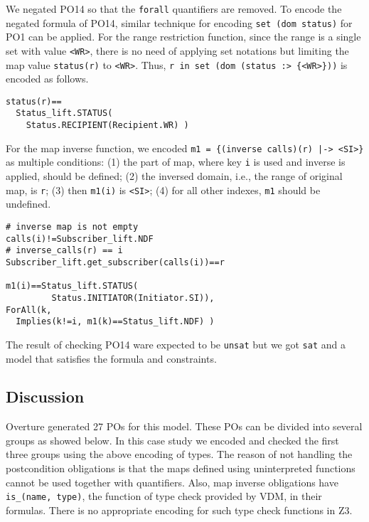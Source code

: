 We negated PO14 so that the {\tt forall} quantifiers are removed. To encode the negated formula of PO14, similar technique for  encoding {\tt set (dom status)} for PO1 can be applied. For the range restriction function, since the range is a single set with value {\tt <WR>}, there is no need of applying set notations but limiting the map value {\tt status(r)} to {\tt <WR>}. Thus, {\tt r in set (dom (status :> \{<WR>\}))} is encoded as follows.

\begin{mdframed}[roundcorner=5pt,shadow=true]
\begin{Verbatim}[fontsize=\small]
status(r)==
  Status_lift.STATUS(
    Status.RECIPIENT(Recipient.WR) )
\end{Verbatim}
\end{mdframed}

For the map inverse function, we encoded {\tt m1 = \{(inverse calls)(r) |-> <SI>\}} as multiple conditions: (1) the part of map, where key {\tt i} is used and inverse is applied, should be defined; (2) the inversed domain, i.e., the range of original map, is {\tt r}; (3) then {\tt m1(i)} is {\tt <SI>}; (4) for all other indexes, {\tt m1} should be undefined.

\begin{mdframed}[roundcorner=5pt,shadow=true]
\begin{Verbatim}[fontsize=\small]
# inverse map is not empty
calls(i)!=Subscriber_lift.NDF 
# inverse_calls(r) == i
Subscriber_lift.get_subscriber(calls(i))==r

m1(i)==Status_lift.STATUS(
         Status.INITIATOR(Initiator.SI)),
ForAll(k, 
  Implies(k!=i, m1(k)==Status_lift.NDF) )
\end{Verbatim}
\end{mdframed}

The result of checking PO14 ware expected to be {\tt unsat} but we got {\tt sat} and a model that satisfies the formula and constraints. 


\subsection{Discussion}

Overture generated 27 POs for this model. These POs can be divided into several groups as showed below. In this case study we encoded and checked the first three groups using the above encoding of types. The reason of not handling the postcondition obligations is that the maps defined using uninterpreted functions cannot be used together with quantifiers. Also, map inverse obligations have {\tt is\_(name, type)}, the function of type check provided by VDM, in their formulas. There is no appropriate encoding for such type check functions in Z3. 

